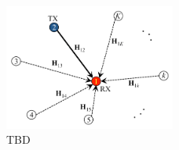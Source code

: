 \documentclass[letterpaper,11pt,onecolumn]{article}
\begin{document}
\begin{figure}[h]
\begin{center}
\includegraphics[width=0.5\textwidth]{../figures/InterferenceAlignment_1.png}
\caption{TBD}
\label{fig:IA_SingleRx}
\end{center}
\end{figure}
\end{document}
